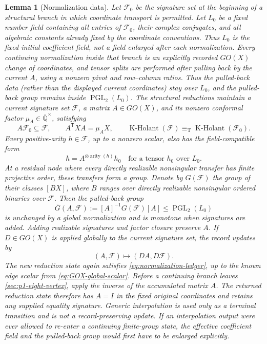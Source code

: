 \documentclass[11pt,letterpaper,onecolumn]{article}
\theoremstyle{plain}
\newtheorem{lemma}[lemma]{Lemma}
\theoremstyle{definition}
\theoremstyle{remark}
\newcommand{\AlgNums}{\overline{\mathbb Q}}
\newcommand{\cF}{\mathcal F}
\newcommand{\KHolant}{\operatorname{K\text{-}Holant}}
\newcommand{\PGL}{\operatorname{PGL}}
\newcommand{\arity}{\operatorname{arity}}
\newcommand{\equivT}{\equiv_{\mathrm T}}
\begin{document}
\begin{lemma}[Normalization data]
\label{lem:normalization-ledger}
Let \(\cF_0\) be the signature set at the beginning of a structural
branch in which coordinate transport is permitted.  Let \(L_0\) be a fixed
number field containing all entries of
\(\cF_0\), their complex conjugates, and all algebraic constants already fixed by
the coordinate conventions.  Thus \(L_0\) is the fixed initial coefficient field, not a
field enlarged after each normalization.  Every continuing normalization
inside that branch is an explicitly recorded \(GO(X)\) change of coordinates, and tensor
splits are performed after pulling back by the current \(A\), using a nonzero
pivot and row--column ratios.  Thus the pulled-back data (rather than the
displayed current coordinates) stay over \(L_0\), and the pulled-back group
remains inside \(\PGL_2(L_0)\).  The
structural reductions maintain a current signature set \(\cF\),
a matrix \(A\in GO(X)\), and its nonzero conformal factor
\(\mu_A\in\AlgNums^\times\), satisfying
\begin{equation}
  A\cF_0\subseteq\cF,\qquad
  A^{\mathsf T}XA=\mu_A X,\qquad
  \KHolant(\cF)\equivT\KHolant(\cF_0).
  \label{eq:normalization-ledger}
\end{equation}
Every positive-arity \(h\in\cF\), up to a nonzero scalar, also has the
field-compatible form
\begin{equation*}
 h=A^{\otimes\arity(h)}h_0
 \quad\text{for a tensor }h_0\text{ over }L_0.
\end{equation*}
At a residual node where every directly realizable nonsingular transfer has
finite projective order, these transfers form a group. Denote by
\(G(\cF)\) the group of their classes \([BX]\), where \(B\) ranges over
directly realizable nonsingular ordered binaries over \(\cF\).  Then the
pulled-back group
\begin{equation*}
 \overline G(A,\cF)
 :=[A]^{-1}G(\cF)[A]
 \le \PGL_2(L_0)
\end{equation*}
is unchanged by a global normalization and is monotone when signatures are added.
Adding realizable signatures and factor closure preserve \(A\).
If \(D\in GO(X)\) is applied globally to the current signature set, the record
updates by
\hypertarget{eq:normalization-ledger-update}{}
\begin{equation*}
  (A,\cF)\longmapsto(DA,D\cF).
\end{equation*}
The new reduction state again satisfies \cref{eq:normalization-ledger}, up to the
known edge scalar from \cref{eq:GOX-global-scalar}.  Before a continuing
branch leaves \cref{sec:p1-eight-vertex}, apply the inverse of the accumulated
matrix \(A\).  The returned reduction state therefore has \(A=I\) in the fixed original coordinates and retains any supplied equality signature.
Generic interpolation is used only as a terminal transition and is not a
record-preserving update.  If an interpolation output were ever allowed to
re-enter a continuing finite-group state, the effective coefficient field
and the pulled-back group would first have to be enlarged explicitly.


\end{lemma}
\end{document}
